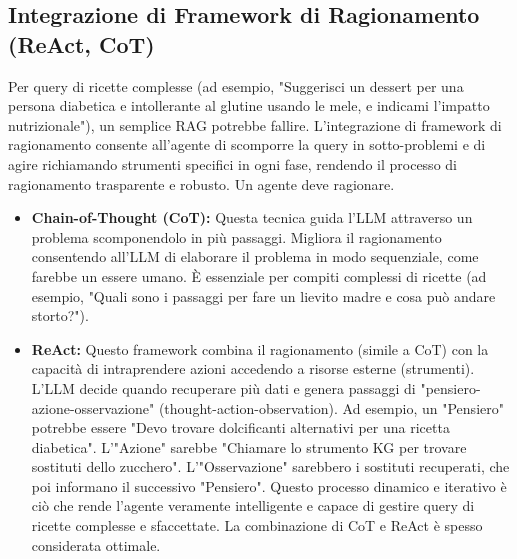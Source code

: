 \documentclass[a4paper, 11pt]{article}
\begin{document}
\subsection{Integrazione di Framework di Ragionamento (ReAct, CoT)}
Per query di ricette complesse (ad esempio, "Suggerisci un dessert per una persona diabetica e intollerante al glutine usando le mele, e indicami l'impatto nutrizionale"), un semplice RAG potrebbe fallire. L'integrazione di framework di ragionamento consente all'agente di scomporre la query in sotto-problemi e di agire richiamando strumenti specifici in ogni fase, rendendo il processo di ragionamento trasparente e robusto. Un agente deve ragionare. \cite{reasoning_rag_survey}
\begin{itemize}
    \item \textbf{Chain-of-Thought (CoT):} Questa tecnica guida l'LLM attraverso un problema scomponendolo in più passaggi. \cite{prompt_engineering_explained} Migliora il ragionamento consentendo all'LLM di elaborare il problema in modo sequenziale, come farebbe un essere umano. È essenziale per compiti complessi di ricette (ad esempio, "Quali sono i passaggi per fare un lievito madre e cosa può andare storto?").
    \item \textbf{ReAct:} Questo framework combina il ragionamento (simile a CoT) con la capacità di intraprendere azioni accedendo a risorse esterne (strumenti). \cite{prompt_engineering_explained} L'LLM decide quando recuperare più dati e genera passaggi di "pensiero-azione-osservazione" (thought-action-observation). Ad esempio, un "Pensiero" potrebbe essere "Devo trovare dolcificanti alternativi per una ricetta diabetica". L'"Azione" sarebbe "Chiamare lo strumento KG per trovare sostituti dello zucchero". L'"Osservazione" sarebbero i sostituti recuperati, che poi informano il successivo "Pensiero". Questo processo dinamico e iterativo è ciò che rende l'agente veramente intelligente e capace di gestire query di ricette complesse e sfaccettate. La combinazione di CoT e ReAct è spesso considerata ottimale. \cite{prompt_engineering_explained}
\end{itemize}
\end{document}
